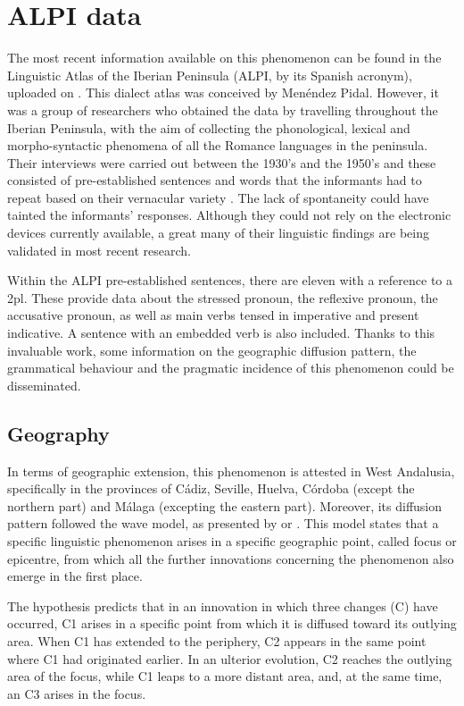 \documentclass[output=paper]{LSP/langsci}
\begin{document}
\section{ALPI data}

The most recent information available on this phenomenon can be found in the Linguistic Atlas of the Iberian Peninsula (ALPI, by its Spanish acronym), uploaded on \citet{heap_atlas_2003}. This dialect atlas was conceived by Menéndez Pidal. However, it was a group of researchers who obtained the data by travelling throughout the Iberian Peninsula, with the aim of collecting the phonological, lexical and morpho-syntactic phenomena of all the Romance languages in the peninsula. Their interviews were carried out between the 1930’s and the 1950’s and these consisted of pre-established sentences and words that the informants had to repeat based on their vernacular variety \citep{sanchis_guarner_atlas_1962}. The lack of spontaneity could have tainted the informants’ responses. Although they could not rely on the electronic devices currently available, a great many of their linguistic findings are being validated in most recent research. 

Within the ALPI pre-established sentences, there are eleven with a reference to a 2pl. These provide data about the stressed pronoun, the reflexive pronoun, the accusative pronoun, as well as main verbs tensed in imperative and present indicative. A sentence with an embedded verb is also included. Thanks to this invaluable work, some information on the geographic diffusion pattern, the grammatical behaviour and the pragmatic incidence of this phenomenon could be disseminated.

\subsection{Geography}
In terms of geographic extension, this phenomenon is attested in West Andalusia, specifically in the provinces of Cádiz, Seville, Huelva, Córdoba (except the northern part) and Málaga (excepting the eastern part). Moreover, its diffusion pattern followed the wave model, as presented by \citet{chambers_dialectology_1980} or \citet{wolfram_dialectology_2003}. This model states that a specific linguistic phenomenon arises in a specific geographic point, called focus or epicentre, from which all the further innovations concerning the phenomenon also emerge in the first place. 

The hypothesis predicts that in an innovation in which three changes (C) have occurred, C1 arises in a specific point from which it is diffused toward its outlying area. When C1 has extended to the periphery, C2 appears in the same point where C1 had originated earlier. In an ulterior evolution, C2 reaches the outlying area of the focus, while C1 leaps to a more distant area, and, at the same time, an C3 arises in the focus.
\end{document}
